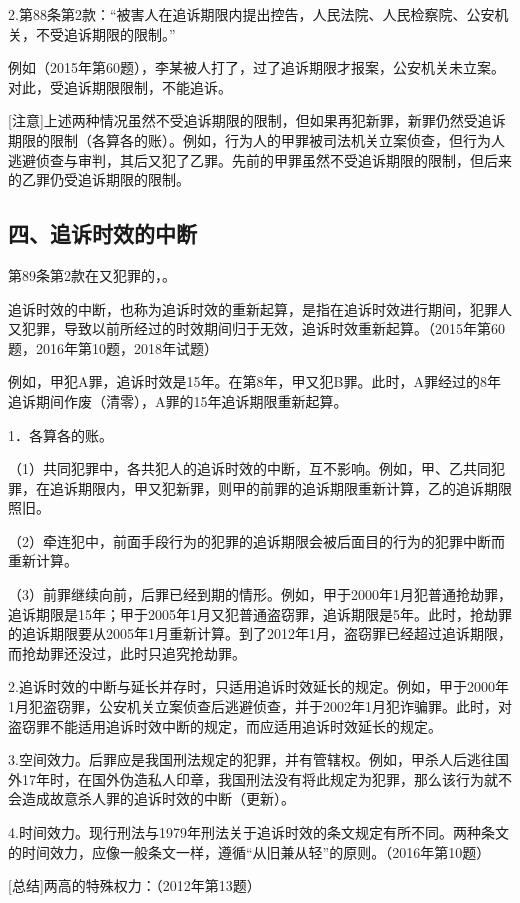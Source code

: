 2.第88条第2款：“被害人在追诉期限内提出控告，人民法院、人民检察院、公安机关，不受追诉期限的限制。”

例如（2015年第60题），李某被人打了，过了追诉期限才报案，公安机关未立案。对此，受追诉期限限制，不能追诉。

[注意]上述两种情况虽然不受追诉期限的限制，但如果再犯新罪，新罪仍然受追诉期限的限制（各算各的账）。例如，行为人的甲罪被司法机关立案侦查，但行为人逃避侦查与审判，其后又犯了乙罪。先前的甲罪虽然不受追诉期限的限制，但后来的乙罪仍受追诉期限的限制。

\subsection*{四、追诉时效的中断}

第89条第2款在又犯罪的，。

追诉时效的中断，也称为追诉时效的重新起算，是指在追诉时效进行期间，犯罪人又犯罪，导致以前所经过的时效期间归于无效，追诉时效重新起算。（2015年第60题，2016年第10题，2018年试题）

例如，甲犯A罪，追诉时效是15年。在第8年，甲又犯B罪。此时，A罪经过的8年追诉期间作废（清零），A罪的15年追诉期限重新起算。


1．各算各的账。

（1）共同犯罪中，各共犯人的追诉时效的中断，互不影响。例如，甲、乙共同犯罪，在追诉期限内，甲又犯新罪，则甲的前罪的追诉期限重新计算，乙的追诉期限照旧。

（2）牵连犯中，前面手段行为的犯罪的追诉期限会被后面目的行为的犯罪中断而重新计算。

（3）前罪继续向前，后罪已经到期的情形。例如，甲于2000年1月犯普通抢劫罪，追诉期限是15年；甲于2005年1月又犯普通盗窃罪，追诉期限是5年。此时，抢劫罪的追诉期限要从2005年1月重新计算。到了2012年1月，盗窃罪已经超过追诉期限，而抢劫罪还没过，此时只追究抢劫罪。

2.追诉时效的中断与延长并存时，只适用追诉时效延长的规定。例如，甲于2000年1月犯盗窃罪，公安机关立案侦查后逃避侦查，并于2002年1月犯诈骗罪。此时，对盗窃罪不能适用追诉时效中断的规定，而应适用追诉时效延长的规定。

3.空间效力。后罪应是我国刑法规定的犯罪，并有管辖权。例如，甲杀人后逃往国外17年时，在国外伪造私人印章，我国刑法没有将此规定为犯罪，那么该行为就不会造成故意杀人罪的追诉时效的中断（更新）。

4.时间效力。现行刑法与1979年刑法关于追诉时效的条文规定有所不同。两种条文的时间效力，应像一般条文一样，遵循“从旧兼从轻”的原则。（2016年第10题）

[总结]两高的特殊权力：（2012年第13题）


